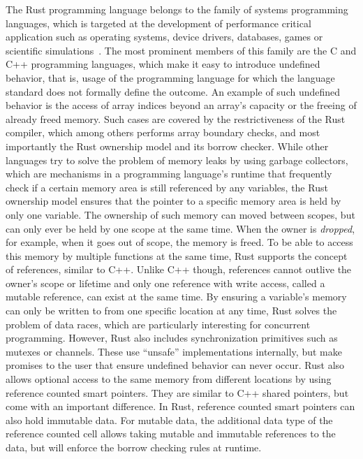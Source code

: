 The Rust programming language belongs to the family of systems programming languages, which is targeted at the development of performance critical application such as operating systems, device drivers, databases, games or scientific simulations~\cite{blandyProgrammingRust2021}.
The most prominent members of this family are the C and C++ programming languages, which make it easy to introduce undefined behavior, that is, usage of the programming language for which the language standard does not formally define the outcome.
An example of such undefined behavior is the access of array indices beyond an array's capacity or the freeing of already freed memory.
Such cases are covered by the restrictiveness of the Rust compiler, which among others performs array boundary checks, and most importantly the Rust ownership model and its borrow checker.
While other languages try to solve the problem of memory leaks by using garbage collectors, which are mechanisms in a programming language's runtime that frequently check if a certain memory area is still referenced by any variables, the Rust ownership model ensures that the pointer to a specific memory area is held by only one variable.
The ownership of such memory can moved between scopes, but can only ever be held by one scope at the same time.
When the owner is \textit{dropped}, for example, when it goes out of scope, the memory is freed.
To be able to access this memory by multiple functions at the same time, Rust supports the concept of references, similar to C++.
Unlike C++ though, references cannot outlive the owner's scope or lifetime and only one reference with write access, called a mutable reference, can exist at the same time.
By ensuring a variable's memory can only be written to from one specific location at any time, Rust solves the problem of data races, which are particularly interesting for concurrent programming.
However, Rust also includes synchronization primitives such as mutexes or channels.
These use \enquote{unsafe} implementations internally, but make promises to the user that ensure undefined behavior can never occur.
Rust also allows optional access to the same memory from different locations by using reference counted smart pointers.
They are similar to C++ shared pointers, but come with an important difference.
In Rust, reference counted smart pointers can also hold immutable data.
For mutable data, the additional data type of the reference counted cell allows taking mutable and immutable references to the data, but will enforce the borrow checking rules at runtime.


